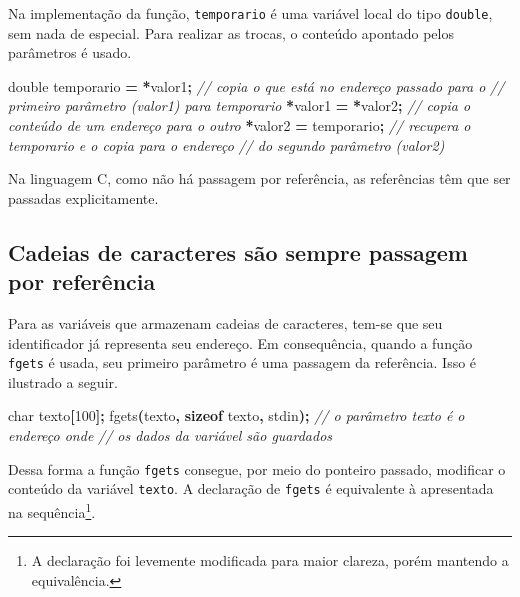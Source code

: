 \documentclass[
  11pt,
  a4paper,
]{scrbook}
\newenvironment{Shaded}{\begin{snugshade}}{\end{snugshade}}
\newcommand{\CommentTok}[1]{\textcolor[rgb]{0.56,0.35,0.01}{\textit{#1}}}
\newcommand{\DataTypeTok}[1]{\textcolor[rgb]{0.13,0.29,0.53}{#1}}
\newcommand{\DecValTok}[1]{\textcolor[rgb]{0.00,0.00,0.81}{#1}}
\newcommand{\KeywordTok}[1]{\textcolor[rgb]{0.13,0.29,0.53}{\textbf{#1}}}
\newcommand{\NormalTok}[1]{#1}
\newcommand{\OperatorTok}[1]{\textcolor[rgb]{0.81,0.36,0.00}{\textbf{#1}}}
\begin{document}
Na implementação da função, \texttt{temporario} é uma variável local do
tipo \texttt{double}, sem nada de especial. Para realizar as trocas, o
conteúdo apontado pelos parâmetros é usado.

\begin{Shaded}
\begin{Highlighting}[]
\DataTypeTok{double}\NormalTok{ temporario }\OperatorTok{=} \OperatorTok{*}\NormalTok{valor1}\OperatorTok{;}  \CommentTok{// copia o que está no endereço passado para o}
                              \CommentTok{// primeiro parâmetro (valor1) para temporario}
\OperatorTok{*}\NormalTok{valor1 }\OperatorTok{=} \OperatorTok{*}\NormalTok{valor2}\OperatorTok{;}  \CommentTok{// copia o conteúdo de um endereço para o outro}
\OperatorTok{*}\NormalTok{valor2 }\OperatorTok{=}\NormalTok{ temporario}\OperatorTok{;}  \CommentTok{// recupera o temporario e o copia para o endereço }
                       \CommentTok{// do segundo parâmetro (valor2)}
\end{Highlighting}
\end{Shaded}

Na linguagem C, como não há passagem por referência, as referências têm
que ser passadas explicitamente.

\subsection{Cadeias de caracteres são sempre passagem por
referência}\label{cadeias-de-caracteres-suxe3o-sempre-passagem-por-referuxeancia}

Para as variáveis que armazenam cadeias de caracteres, tem-se que seu
identificador já representa seu endereço. Em consequência, quando a
função \texttt{fgets} é usada, seu primeiro parâmetro é uma passagem da
referência. Isso é ilustrado a seguir.

\begin{Shaded}
\begin{Highlighting}[]
\DataTypeTok{char}\NormalTok{ texto}\OperatorTok{[}\DecValTok{100}\OperatorTok{];}
\NormalTok{fgets}\OperatorTok{(}\NormalTok{texto}\OperatorTok{,} \KeywordTok{sizeof}\NormalTok{ texto}\OperatorTok{,}\NormalTok{ stdin}\OperatorTok{);}  \CommentTok{// o parâmetro texto é o endereço onde}
                                    \CommentTok{// os dados da variável são guardados}
\end{Highlighting}
\end{Shaded}

Dessa forma a função \texttt{fgets} consegue, por meio do ponteiro
passado, modificar o conteúdo da variável \texttt{texto}. A declaração
de \texttt{fgets} é equivalente à apresentada na sequência\footnote{A
  declaração foi levemente modificada para maior clareza, porém mantendo
  a equivalência.}.
\end{document}

